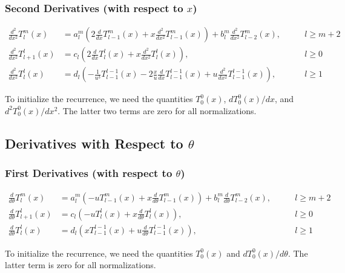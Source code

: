 \documentclass[12pt]{article}
\begin{document}
\subsubsection{Second Derivatives (with respect to $x$)}

\begin{subequations}
\begin{alignat}{3}
\frac{d^2}{dx^2} T_l^m(x) &= a_l^m \left( 2 \frac{d}{dx} T_{l-1}^m(x) + x \frac{d^2}{dx^2} T_{l-1}^m(x) \right) + b_l^m \frac{d^2}{dx^2} T_{l-2}^m(x), & \qquad l \geq m + 2 \\
\frac{d^2}{dx^2} T_{l+1}^l(x) &= c_l \left( 2 \frac{d}{dx} T_l^l(x) + x \frac{d^2}{dx^2} T_l^l(x) \right), & \qquad l \geq 0 \\
\frac{d^2}{dx^2} T_l^l(x) &= d_l \left( -\frac{1}{u^3} T_{l-1}^{l-1}(x) - 2 \frac{x}{u} \frac{d}{dx} T_{l-1}^{l-1}(x) + u \frac{d^2}{dx^2} T_{l-1}^{l-1}(x) \right), & \qquad l \geq 1
\end{alignat}
\end{subequations}

To initialize the recurrence, we need the quantities $T_0^0(x)$, $d T_0^0(x) / dx$, and $d^2 T_0^0(x) / dx^2$. The latter
two terms are zero for all normalizations.

\subsection{Derivatives with Respect to $\theta$}

\subsubsection{First Derivatives (with respect to $\theta$)}

\begin{subequations}
\begin{alignat}{3}
\frac{d}{d \theta} T_l^m(x) &= a_l^m \left( -u T_{l-1}^m(x) + x \frac{d}{d \theta} T_{l-1}^m(x) \right) + b_l^m \frac{d}{d \theta} T_{l-2}^m(x), & \qquad l \geq m + 2 \\
\frac{d}{d \theta} T_{l+1}^l(x) &= c_l \left( -u T_l^l(x) + x \frac{d}{d \theta} T_l^l(x) \right), & \qquad l \geq 0 \\
\frac{d}{d \theta} T_l^l(x) &= d_l \left( x T_{l-1}^{l-1}(x) + u \frac{d}{d \theta} T_{l-1}^{l-1}(x) \right), & \qquad l \geq 1
\end{alignat}
\end{subequations}

To initialize the recurrence, we need the quantities $T_0^0(x)$ and $d T_0^0(x) / d\theta$. The latter
term is zero for all normalizations.
\end{document}
